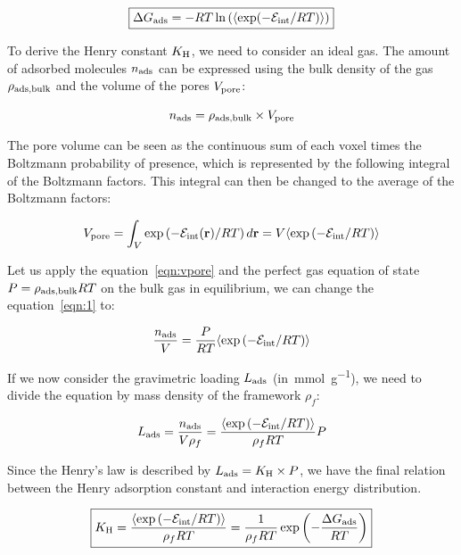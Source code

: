 \documentclass[main.tex]{subfiles}
\begin{document}
\begin{equation}\label{eq:ads_gibbs}
  \boxed{
  \Delta G_{\text{ads}} = -RT \ln\left(\langle \exp(-\mathcal{E}_{\text{int}}/RT) \rangle\right)
  }
\end{equation}

To derive the Henry constant $K_{\text{H}}$, we need to consider an ideal gas. The amount of adsorbed molecules $n_{\text{ads}}$ can be expressed using the bulk density of the gas $\rho_{\text{ads,bulk}}$ and the volume of the pores $V_{\text{pore}}$:

\begin{equation}\label{eqn:1}
    n_{\text{ads}} = \rho_{\text{ads,bulk}} \times V_{\text{pore}}  
\end{equation}

The pore volume can be seen as the continuous sum of each voxel times the Boltzmann probability of presence, which is represented by the following integral of the Boltzmann factors. This integral can then be changed to the average of the Boltzmann factors:

\begin{equation}\label{eqn:vpore}
    V_{\text{pore}} = \int_V \exp\left(- \mathcal{E}_{\text{int}}(\textbf{r})/RT\right) d\textbf{r} = V \langle \exp\left(-\mathcal{E}_{\text{int}}/RT\right) \rangle
\end{equation}

Let us apply the equation~\ref{eqn:vpore} and the perfect gas equation of state $P = \rho_{\text{ads,bulk}}RT$ on the bulk gas in equilibrium, we can change the equation~\ref{eqn:1} to:

\begin{equation}
    \dfrac{n_{\text{ads}}}{V} = \dfrac{P}{RT} \langle \exp\left(-\mathcal{E}_{\text{int}}/RT\right) \rangle
\end{equation}

If we now consider the gravimetric loading $L_{\text{ads}}$ (in~\si{\milli\mole\per\gram}), we need to divide the equation by mass density of the framework $\rho_f$:

\begin{equation}
  L_{\text{ads}} = \dfrac{n_{\text{ads}}}{V\rho_f} = \dfrac{\langle \exp\left(-\mathcal{E}_{\text{int}}/RT\right) \rangle}{\rho_fRT} P
\end{equation}

Since the Henry's law is described by $L_{\text{ads}}=K_{\text{H}} \times P$, we have the final relation between the Henry adsorption constant and interaction energy distribution.

\begin{equation}\label{eqn:henry}
    \boxed{
    K_{\text{H}} = \dfrac{\langle \exp\left(-\mathcal{E}_{\text{int}}/RT\right) \rangle}{\rho_fRT} = \dfrac{1}{\rho_fRT} \exp\left(-\dfrac{\Delta G_{\text{ads}}}{RT}\right)
    }
\end{equation}
\end{document}
